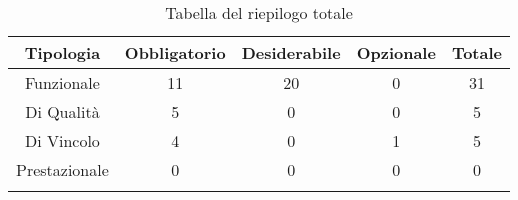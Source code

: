 \begin{center}
  \centering
  \begin{longtable}{|c|c|c|c|c|}
    \hline
    \rowcolor[HTML]{036400}
    {\color[HTML]{FFFFFF} \textbf{Tipologia}} & {\color[HTML]{FFFFFF} \textbf{Obbligatorio}} & {\color[HTML]{FFFFFF} \textbf{Desiderabile}} & {\color[HTML]{FFFFFF} \textbf{Opzionale}}  & {\color[HTML]{FFFFFF} \textbf{Totale}} \\ \hline
    \rowcolor[HTML]{EFEFEF}
    Funzionale & 11 & 20 & 0 & 31 \\ \hline
    \rowcolor[HTML]{C0C0C0}
    Di Qualità & 5 & 0 & 0 & 5 \\ \hline
    \rowcolor[HTML]{EFEFEF}
    Di Vincolo & 4 & 0 & 1 & 5 \\ \hline
    \rowcolor[HTML]{C0C0C0}
    Prestazionale & 0 & 0 & 0 & 0 \\ \hline

    \caption{Tabella del riepilogo totale}
  \end{longtable}
\end{center}
